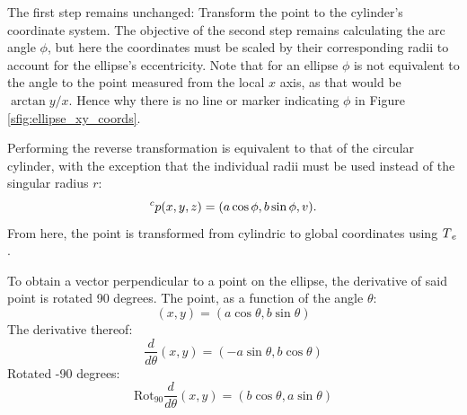 The first step remains unchanged: Transform the point to the cylinder's coordinate system.
The objective of the second step remains calculating the arc angle $\phi$, but here the coordinates must be scaled by their corresponding radii to account for the ellipse's eccentricity.
Note that for an ellipse $\phi$ is not equivalent to the angle to the point measured from the local $x$ axis, as that would be $\arctan y/x$.
Hence why there is no line or marker indicating $\phi$ in Figure \ref{sfig:ellipse_xy_coords}.

Performing the reverse transformation is equivalent to that of the circular cylinder, with the exception that the individual radii must be used instead of the singular radius $r$:
\begin{equation*}
	\prescript{c}{}p(x,y,z) = (a \cos \phi, b \sin \phi, v).
\end{equation*}
From here, the point is transformed from cylindric to global coordinates using $\prescript{}{}T_e$.

\iffalse
To obtain a vector perpendicular to a point on the ellipse, the derivative of said point is rotated 90 degrees.
The point, as a function of the angle $\theta$:
\begin{equation}
	(x,y) = (a\cos\theta, b\sin\theta)
\end{equation}
The derivative thereof:
\begin{equation}
	\frac{d}{d\theta}(x,y) = (-a\sin\theta, b\cos\theta)
\end{equation}
Rotated -90 degrees:
\begin{equation}
	\text{Rot}_{90}\frac{d}{d\theta}(x,y) = (b\cos\theta, a\sin\theta)
\end{equation}

